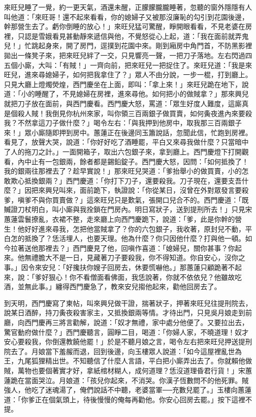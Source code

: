 來旺兒睡了一覺，約一更天氣，酒還未醒，正朦朦朧朧睡著，忽聽的窗外隱隱有人叫他道：「來旺哥！還不起來看看，你的媳婦子又被那沒廉恥的勾引到花園後邊，幹那營生去了。虧你倒睡的放心！」來旺兒猛可驚醒，睜開眼看看，不見老婆在房裡，只認是雪娥看見甚動靜來遞信與他，不覺怒從心上起，道：「我在面前就弄鬼兒！」忙跳起身來，開了房門，逕撲到花園中來。剛到廂房中角門首，不防黑影裡拋出一條凳子來，把來旺兒絆了一交，只見響亮一聲，一把刀子落地。左右閃過四五個小廝，大叫：「有賊！」一齊向前，把來旺兒一把捉住了。來旺兒道：「我是來旺兒，進來尋媳婦子，如何把我拿住了？」眾人不由分說，一步一棍，打到廳上。只見大廳上燈燭熒煌，西門慶坐在上面，即叫：「拿上來！」來旺兒跪在地下，說道：「小的睡醒了，不見媳婦在房裡，進來尋他。如何把小的做賊拿？」那來興兒就把刀子放在面前，與西門慶看。西門慶大怒，罵道：「眾生好度人難度，這廝真是個殺人賊！我倒見你杭州來家，叫你領三百兩銀子做買賣，如何夤夜進內來要殺我？不然拿這刀子做什麼？」喝令左右：「與我押到他房中，取我那三百兩銀子來！」眾小廝隨即押到房中。蕙蓮正在後邊同玉簫說話，忽聞此信，忙跑到房裡。看見了，放聲大哭，說道：「你好好吃了酒睡罷，平白又來尋我做什麼？只當暗中了人的拖刀之計。」一面開箱子，取出六包銀子來，拿到廳上。西門慶燈下打開觀看，內中止有一包銀兩，餘者都是錫鉛錠子。西門慶大怒，因問：「如何抵換了！我的銀兩往那裡去了？趁早實說！」那來旺兒哭道：「爹抬舉小的做買賣，小的怎敢欺心抵換銀兩？」西門慶道：「你打下刀子，還要殺我。刀子現在，還要支吾什麼？」因把來興兒叫來，面前跪下，執證說：「你從某日，沒曾在外對眾發言要殺爹，嗔爹不與你買賣做？」這來旺兒只是歎氣，張開口兒合不的。西門慶道：「既贓證刀杖明白，叫小廝與我拴鎖在門房內。明日寫狀子，送到提刑所去！」只見宋蕙蓮雲鬟撩亂，衣裙不整，走來廳上向西門慶跪下，說道：「爹，此是你幹的營生！他好好進來尋我，怎把他當賊拿了？你的六包銀子，我收著，原封兒不動，平白怎的抵換了？恁活埋人，也要天理。他為什麼？你只因他什麼？打與他一頓。如今拉著送他那裡去？」西門慶見了他，回嗔作喜道：「媳婦兒，關你甚事？你起來。他無禮膽大不是一日，見藏著刀子要殺我，你不得知道。你自安心，沒你之事。」因令來安兒：「好攙扶你嫂子回房去，休要慌嚇他。」那蕙蓮只顧跪著不起來，說：「爹好狠心！你不看僧面看佛面，我恁說著，你就不依依兒？他雖故吃酒，並無此事。」纏得西門慶急了，教來安兒搊他起來，勸他回房去了。

到天明，西門慶寫了柬帖，叫來興兒做干證，揣著狀子，押著來旺兒往提刑院去，說某日酒醉，持刀夤夜殺害家主，又抵換銀兩等情。才待出門，只見吳月娘走到前廳，向西門慶再三將言勸解，說道：「奴才無禮，家中處分他便了。又要拉出去，驚官動府做什麼？」西門慶聽言，圓睜二目，喝道：「你婦人家，不曉道理！奴才安心要殺我，你倒還教饒他罷！」於是不聽月娘之言，喝令左右把來旺兒押送提刑院去了。月娘當下羞赧而退，回到後邊，向玉樓眾人說道：「如今這屋裡亂世為王，九尾狐狸精出世。不知聽信了什麼人言語，平白把小廝弄出去了。你就賴他做賊，萬物也要個著實才好，拿紙棺材糊人，成何道理？恁沒道理昏君行貨！」宋蕙蓮跪在當面哭泣。月娘道：「孩兒你起來，不消哭。你漢子恆數問不的他死罪。賊強人，他吃了迷魂湯了，俺們說話不中聽，老婆當軍──充數兒罷了。」玉樓向蕙蓮道：「你爹正在個氣頭上，待後慢慢的俺每再勸他。你安心回房去罷。」按下這裡不提。

